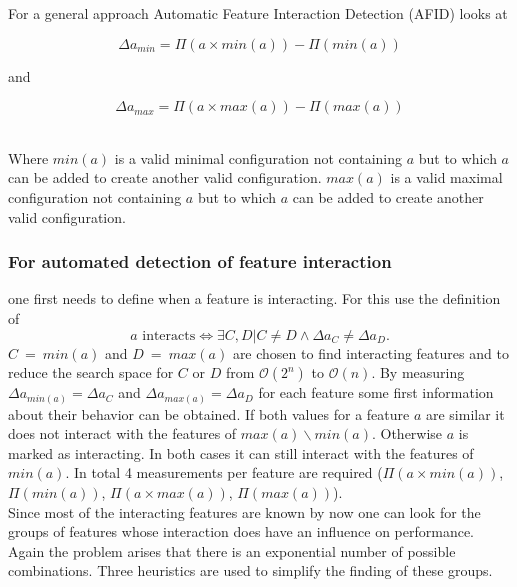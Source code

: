 For a general approach Automatic Feature Interaction Detection (AFID) looks at
\begin{minipage}{\textwidth}
\begin{equation}
	\Delta a_{min} = \Pi(a \times min(a)) - \Pi(min(a))
\end{equation}
\begin{center}
	and
\end{center}
\begin{equation}
	\Delta a_{max} = \Pi(a \times max(a)) - \Pi(max(a))
\end{equation}
\end{minipage}\\[0.3cm]
 Where $min(a)$ is a valid minimal configuration not containing $a$ but to which $a$ can be added to create another valid configuration. $max(a)$ is a valid maximal configuration not containing $a$ but to which $a$ can be added to create another valid configuration.\\
 \subsubsection[Automated detection of feature interaction]{\textnormal{For} automated detection of feature interaction} 
one first needs to define when a feature is interacting. For this \citet{AutomatedFeatureDetectionSiegmund2012} use the definition of 
 \begin{equation}
 a \text{ interacts} \Leftrightarrow \exists C,D | C \neq D  \land	 \Delta a_C \neq \Delta a_D .
 \end{equation}
 $C~=~min(a)$ and $D~=~max(a)$ are chosen to find interacting features and to reduce the search space for $C$ or $D$ from $\mathcal{O}(2^n)$ to $\mathcal{O}(n)$. By measuring $\Delta a_{min(a)}=\Delta a_C$ and $\Delta a_{max(a)}=\Delta a_D$ for each feature some first information about their behavior can be obtained. If both values for a feature $a$ are similar it does not interact with the features of $max(a)\backslash min(a)$. Otherwise $a$ is marked as interacting. In both cases it can still interact with the features of $min(a)$. In total 4 measurements per feature are required ($\Pi(a \times min(a))$, $\Pi(min(a))$, $\Pi(a\times max(a))$, $\Pi(max(a))$).\\
 Since most of the interacting features are known by now one can look for the groups of features whose interaction does have an influence on performance. Again the problem arises that there is an exponential number of possible combinations. Three heuristics are used to simplify the finding of these groups.
 
